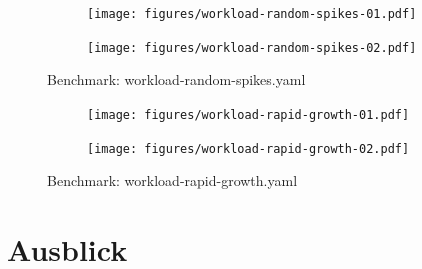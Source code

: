 \documentclass[runningheads]{llncs}
\begin{document}
\begin{figure}
	\centering
	\begin{subfigure}{.5\textwidth}
		\centering
		\texttt{[image: figures/workload-random-spikes-01.pdf]}
		\label{fig:sub1}
	\end{subfigure}%
	\begin{subfigure}{.5\textwidth}
		\centering
		\texttt{[image: figures/workload-random-spikes-02.pdf]}
		\label{fig:sub2}
	\end{subfigure}
	\caption{Benchmark: workload-random-spikes.yaml}
	\label{fig:test}
\end{figure}	

\begin{figure}
	\centering
	\begin{subfigure}{.5\textwidth}
		\centering
		\texttt{[image: figures/workload-rapid-growth-01.pdf]}
		\label{fig:sub1}
	\end{subfigure}%
	\begin{subfigure}{.5\textwidth}
		\centering
		\texttt{[image: figures/workload-rapid-growth-02.pdf]}
		\label{fig:sub2}
	\end{subfigure}
	\caption{Benchmark: workload-rapid-growth.yaml}
	\label{fig:test}
\end{figure}	
	
\section{Ausblick}
	
%
%
\newpage


%
\end{document}
